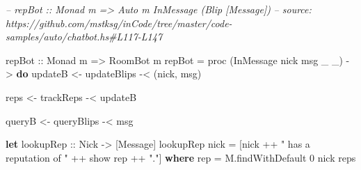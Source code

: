 \documentclass[]{article}
\newenvironment{Shaded}{}{}
\newcommand{\CommentTok}[1]{\textcolor[rgb]{0.38,0.63,0.69}{\textit{#1}}}
\newcommand{\DataTypeTok}[1]{\textcolor[rgb]{0.56,0.13,0.00}{#1}}
\newcommand{\DecValTok}[1]{\textcolor[rgb]{0.25,0.63,0.44}{#1}}
\newcommand{\FunctionTok}[1]{\textcolor[rgb]{0.02,0.16,0.49}{#1}}
\newcommand{\KeywordTok}[1]{\textcolor[rgb]{0.00,0.44,0.13}{\textbf{#1}}}
\newcommand{\NormalTok}[1]{#1}
\newcommand{\OtherTok}[1]{\textcolor[rgb]{0.00,0.44,0.13}{#1}}
\newcommand{\StringTok}[1]{\textcolor[rgb]{0.25,0.44,0.63}{#1}}
\begin{document}
\begin{Shaded}
\begin{Highlighting}[]
\CommentTok{-- repBot :: Monad m => Auto m InMessage (Blip [Message])}
\CommentTok{-- source: https://github.com/mstksg/inCode/tree/master/code-samples/auto/chatbot.hs#L117-L147}

\OtherTok{repBot ::} \DataTypeTok{Monad}\NormalTok{ m }\OtherTok{=>} \DataTypeTok{RoomBot}\NormalTok{ m}
\NormalTok{repBot }\FunctionTok{=}\NormalTok{ proc (}\DataTypeTok{InMessage}\NormalTok{ nick msg _ _) }\OtherTok{->} \KeywordTok{do}
\NormalTok{    updateB }\OtherTok{<-}\NormalTok{ updateBlips }\FunctionTok{-<}\NormalTok{ (nick, msg)}

\NormalTok{    reps    }\OtherTok{<-}\NormalTok{ trackReps   }\FunctionTok{-<}\NormalTok{ updateB}

\NormalTok{    queryB  }\OtherTok{<-}\NormalTok{ queryBlips  }\FunctionTok{-<}\NormalTok{ msg}

    \KeywordTok{let}\OtherTok{ lookupRep ::} \DataTypeTok{Nick} \OtherTok{->}\NormalTok{ [}\DataTypeTok{Message}\NormalTok{]}
\NormalTok{        lookupRep nick }\FunctionTok{=}\NormalTok{ [nick }\FunctionTok{++} \StringTok{" has a reputation of "} \FunctionTok{++}\NormalTok{ show rep }\FunctionTok{++} \StringTok{"."}\NormalTok{]}
          \KeywordTok{where}
\NormalTok{            rep }\FunctionTok{=}\NormalTok{ M.findWithDefault }\DecValTok{0}\NormalTok{ nick reps}


\end{Highlighting}
\end{Shaded}
\end{document}
